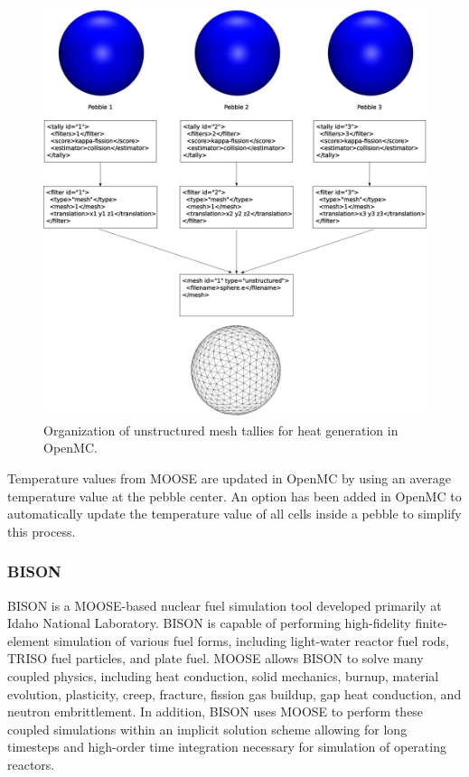 \begin{figure}[ht]
    \centering
    \includegraphics[width=\textwidth]{Figures/umesh_tally_diagram}
    \caption{Organization of unstructured mesh tallies for heat generation in OpenMC.}
    \label{fig:umesh_tally_steup}
\end{figure}


Temperature values from MOOSE are updated in OpenMC by using an average temperature value at the pebble center. An option has been added in OpenMC to automatically update the temperature value of all cells inside a pebble to simplify this process.

\subsubsection{BISON}

BISON is a MOOSE-based \cite{hales2013triso, williamson2012multidimensional} nuclear fuel simulation tool developed primarily at Idaho National Laboratory.
BISON is capable of performing high-fidelity finite-element simulation of various fuel forms, including
light-water reactor fuel rods, TRISO fuel particles, and plate fuel. MOOSE allows BISON to solve many
coupled physics, including heat conduction, solid mechanics, burnup, material evolution, plasticity, creep,
fracture, fission gas buildup, gap heat conduction, and neutron embrittlement. In addition, BISON uses
MOOSE to perform these coupled simulations within an implicit solution scheme allowing for long timesteps
and high-order time integration necessary for simulation of operating reactors.

